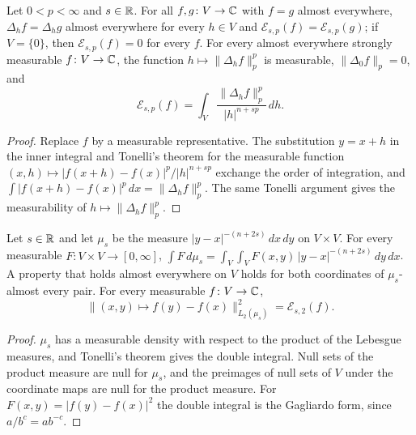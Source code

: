 \begin{lemma}
\label{lem:slobodeckij-form-step}
\leanok
{}
Let $0 < p < \infty$ and $s \in \mathbb{R}$. For all $f, g \colon V \to \mathbb{C}$ with $f = g$ almost
everywhere, $\Delta_h f = \Delta_h g$ almost everywhere for every $h \in V$ and
$\mathcal{E}_{s,p}(f) = \mathcal{E}_{s,p}(g)$; if $V = \{0\}$, then
$\mathcal{E}_{s,p}(f) = 0$ for every $f$. For every almost everywhere strongly measurable
$f \colon V \to \mathbb{C}$, the function $h \mapsto \|\Delta_h f\|_p^p$ is measurable,
$\|\Delta_0 f\|_p = 0$, and
\[
  \mathcal{E}_{s,p}(f) = \int_V \frac{\|\Delta_h f\|_p^p}{|h|^{n + sp}} \, dh .
\]
\end{lemma}

\begin{proof}
\leanok
Replace $f$ by a measurable representative. The substitution $y = x + h$ in the inner integral
and Tonelli's theorem for the measurable function
$(x, h) \mapsto |f(x + h) - f(x)|^p / |h|^{n + sp}$ exchange the order of integration, and
$\int |f(x + h) - f(x)|^p \, dx = \|\Delta_h f\|_p^p$. The same Tonelli argument gives the
measurability of $h \mapsto \|\Delta_h f\|_p^p$.
\end{proof}

\begin{lemma}
\label{lem:gagliardo-measure}
\leanok
{}
Let $s \in \mathbb{R}$ and let $\mu_s$ be the measure $|y - x|^{-(n + 2s)} \, dx \, dy$ on $V \times V$.
For every measurable $F \colon V \times V \to [0, \infty]$,
$\int F \, d\mu_s = \int_V \int_V F(x, y) \, |y - x|^{-(n + 2s)} \, dy \, dx$. A property that
holds almost everywhere on $V$ holds for both coordinates of $\mu_s$-almost every pair. For every
measurable $f \colon V \to \mathbb{C}$,
\[
  \bigl\|(x, y) \mapsto f(y) - f(x)\bigr\|_{L_2(\mu_s)}^2 = \mathcal{E}_{s,2}(f) .
\]
\end{lemma}

\begin{proof}
\leanok
$\mu_s$ has a measurable density with respect to the product of the Lebesgue measures, and
Tonelli's theorem gives the double integral. Null sets of the product measure are null for
$\mu_s$, and the preimages of null sets of $V$ under the coordinate maps are null for the product
measure. For $F(x, y) = |f(y) - f(x)|^2$ the double integral is the Gagliardo form, since
$a / b^c = a b^{-c}$.
\end{proof}

